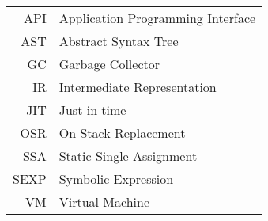 \documentclass[english,master,twoside]{ctufit-thesis}
\begin{document}
\chapter{\thectufitabbreviationlabel}

\begin{tabular}{rl}
	API  & Application Programming Interface \\
	AST  & Abstract Syntax Tree              \\
	GC   & Garbage Collector                 \\
	IR   & Intermediate Representation       \\
	JIT  & Just-in-time                      \\
	OSR  & On-Stack Replacement              \\
	SSA  & Static Single-Assignment          \\
	SEXP & Symbolic Expression               \\
	VM   & Virtual Machine                   \\
\end{tabular}


\resumeTOCentries
\mainmatter\mainmatterinit %








\appendix\appendixinit %

\backmatter %

\printbibliography %
\end{document}

